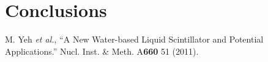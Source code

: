 \documentclass[11pt,prd,letterpaper,amsmath,amssymb,final,nofootinbib
,unsortedaddress,superscriptaddress
]{revtex4-1}
\begin{document}
\section{Conclusions}

\begin{thebibliography}{00}

M. Yeh {\it et al.}, { ``A New Water-based Liquid Scintillator and Potential Applications.''} 
Nucl. Inst. \& Meth. A{\bf 660} 51 (2011).

\end{thebibliography}
\end{document}

